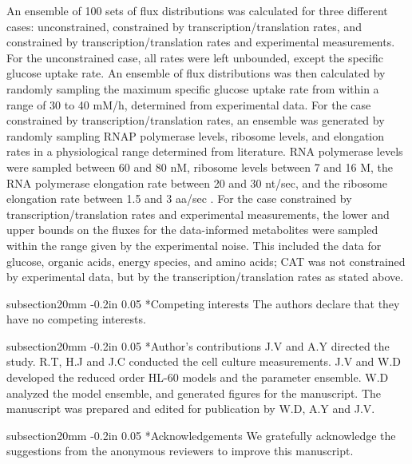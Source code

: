 \documentclass[12pt]{article}
\makeatletter
\renewcommand\section{\@startsection
	{subsection}{2}{0mm}
	{-0.2in}
	{0.05\baselineskip}
	{\normalfont\large\bfseries}}
\makeatother
\begin{document}
An ensemble of 100 sets of flux distributions was calculated for three different cases: unconstrained, constrained by transcription/translation rates, and constrained by transcription/translation rates and experimental measurements.
For the unconstrained case, all rates were left unbounded, except the specific glucose uptake rate.
An ensemble of flux distributions was then calculated by randomly sampling the maximum specific glucose uptake rate from within a range of 30 to 40 mM/h, determined from experimental data.
For the case constrained by transcription/translation rates, an ensemble was generated by randomly sampling RNAP polymerase levels, ribosome levels, and elongation rates in a physiological range determined from literature.
RNA polymerase levels were sampled between 60 and 80 nM, ribosome levels between 7 and 16 \textmu M, the RNA polymerase elongation rate between 20 and 30 nt/sec, and the ribosome elongation rate between 1.5 and 3 aa/sec \cite{2005_underwood_biotech, Garamella:2016aa}.
For the case constrained by transcription/translation rates and experimental measurements, the lower and upper bounds on the fluxes for the data-informed metabolites were sampled within the range given by the experimental noise.
This included the data for glucose, organic acids, energy species, and amino acids; CAT was not constrained by experimental data, but by the transcription/translation rates as stated above.


\clearpage

\section*{Competing interests}
The authors declare that they have no competing interests.

\section*{Author's contributions}
J.V and A.Y directed the study. R.T, H.J and J.C conducted the cell culture measurements.
J.V and W.D developed the reduced order HL-60 models and the parameter ensemble.
W.D analyzed the model ensemble, and generated figures for the manuscript.
The manuscript was prepared and edited for publication by W.D, A.Y and J.V.

\section*{Acknowledgements}
We gratefully acknowledge the suggestions from the anonymous reviewers to improve this manuscript.
\end{document}
